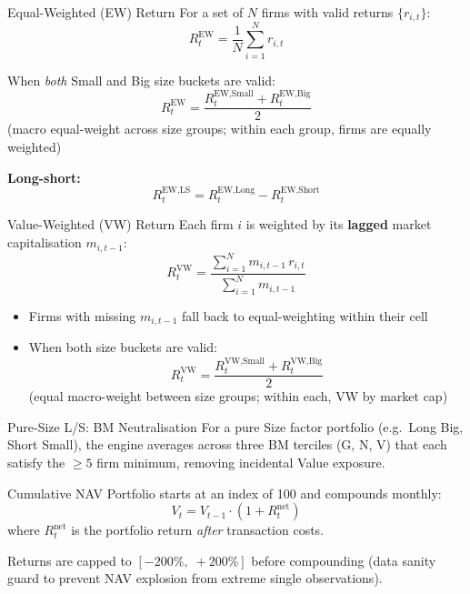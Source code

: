 \documentclass[aspectratio=169, 12pt]{beamer}
\begin{document}
\begin{frame}{Equal-Weighted (EW) Return}
  For a set of $N$ firms with valid returns $\{r_{i,t}\}$:
  \[
    R_t^{\text{EW}} = \frac{1}{N} \sum_{i=1}^{N} r_{i,t}
  \]

  When \emph{both} Small and Big size buckets are valid:
  \[
    R_t^{\text{EW}} = \frac{R_t^{\text{EW,Small}} + R_t^{\text{EW,Big}}}{2}
  \]
  (macro equal-weight across size groups; within each group, firms are equally weighted)

  \medskip
  \textbf{Long-short:}
  \[
    R_t^{\text{EW,LS}} = R_t^{\text{EW,Long}} - R_t^{\text{EW,Short}}
  \]
\end{frame}

\begin{frame}{Value-Weighted (VW) Return}
  Each firm $i$ is weighted by its \textbf{lagged} market capitalisation $m_{i,t-1}$:
  \[
    R_t^{\text{VW}} = \frac{\displaystyle\sum_{i=1}^{N} m_{i,t-1}\, r_{i,t}}{\displaystyle\sum_{i=1}^{N} m_{i,t-1}}
  \]
  \begin{itemize}
    \item Firms with missing $m_{i,t-1}$ fall back to equal-weighting within their cell
    \item When both size buckets are valid:
    \[
      R_t^{\text{VW}} = \frac{R_t^{\text{VW,Small}} + R_t^{\text{VW,Big}}}{2}
    \]
    (equal macro-weight between size groups; within each, VW by market cap)
  \end{itemize}

  \begin{alertblock}{Pure-Size L/S: BM Neutralisation}
    For a pure Size factor portfolio (e.g.\ Long Big, Short Small), the engine averages
    across three BM terciles (G, N, V) that each satisfy the $\geq5$ firm minimum,
    removing incidental Value exposure.
  \end{alertblock}
\end{frame}

\begin{frame}{Cumulative NAV}
  Portfolio starts at an index of 100 and compounds monthly:
  \[
    V_t = V_{t-1} \cdot (1 + R_t^{\text{net}})
  \]
  where $R_t^{\text{net}}$ is the portfolio return \emph{after} transaction costs.

  \medskip
  Returns are capped to $[-200\%,\;+200\%]$ before compounding (data sanity guard to prevent NAV explosion from extreme single observations).
\end{frame}

\end{document}
